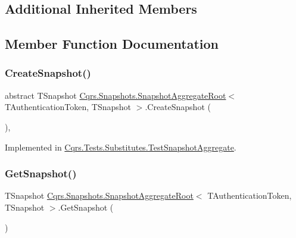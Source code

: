 \subsection*{Additional Inherited Members}


\subsection{Member Function Documentation}
\mbox{\label{classCqrs_1_1Snapshots_1_1SnapshotAggregateRoot_a2d8cd57c7b6c2696d286c6dc5e9f0479}} 
\subsubsection{\texorpdfstring{Create\+Snapshot()}{CreateSnapshot()}}
{\footnotesize\ttfamily abstract T\+Snapshot \hyperlink{classCqrs_1_1Snapshots_1_1SnapshotAggregateRoot}{Cqrs.\+Snapshots.\+Snapshot\+Aggregate\+Root}$<$ T\+Authentication\+Token, T\+Snapshot $>$.Create\+Snapshot (\begin{DoxyParamCaption}{ }\end{DoxyParamCaption})\hspace{0.3cm}{\ttfamily [protected]}, {}}



Implemented in \hyperlink{classCqrs_1_1Tests_1_1Substitutes_1_1TestSnapshotAggregate_a423bba964aa7fe1f8e89fbb153d7db37}{Cqrs.\+Tests.\+Substitutes.\+Test\+Snapshot\+Aggregate}.

\mbox{\label{classCqrs_1_1Snapshots_1_1SnapshotAggregateRoot_a6116e565cb35cee459350a254bb2b893}} 
\subsubsection{\texorpdfstring{Get\+Snapshot()}{GetSnapshot()}}
{\footnotesize\ttfamily T\+Snapshot \hyperlink{classCqrs_1_1Snapshots_1_1SnapshotAggregateRoot}{Cqrs.\+Snapshots.\+Snapshot\+Aggregate\+Root}$<$ T\+Authentication\+Token, T\+Snapshot $>$.Get\+Snapshot (\begin{DoxyParamCaption}{ }\end{DoxyParamCaption})}

